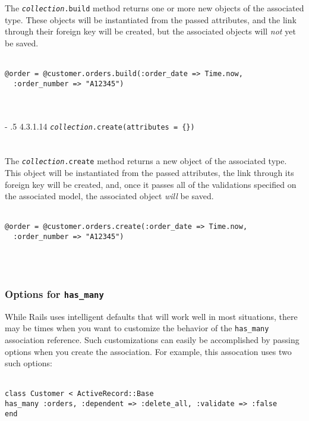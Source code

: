 \documentclass[10pt]{book}
\makeatletter
\renewcommand\paragraph{%
   \@startsection{paragraph}{4}{0mm}%
      {-\baselineskip}%
      {.5\baselineskip}%
      {\normalfont\scriptsize\bfseries}}
\makeatother
\begin{document}
The \texttt{\emph{collection}.build} method returns one or more new  objects of the associated type. These objects will be instantiated from  the passed attributes, and the link through their foreign key will be  created, but the associated objects will \emph{not} yet be saved.
\\ \\
\begin{minipage}{\textwidth}{\scriptsize
\begin{verbatim}
@order = @customer.orders.build(:order_date => Time.now,
  :order_number => "A12345")
\end{verbatim}}
\end{minipage}
\\ \\

\paragraph{4.3.1.14 \texttt{\emph{collection}.create(attributes = \{\})}}\\ \\\\

The \texttt{\emph{collection}.create} method returns a new object  of the associated type. This object will be instantiated from the passed  attributes, the link through its foreign key will be created, and, once  it passes all of the validations specified on the associated model, the  associated object \emph{will} be saved.
\\ \\
\begin{minipage}{\textwidth}{\scriptsize
\begin{verbatim}
@order = @customer.orders.create(:order_date => Time.now,
  :order_number => "A12345")
\end{verbatim}}
\end{minipage}
\\ \\

\subsubsection{ Options for \texttt{has\_many}}

While Rails uses intelligent defaults that will work well in most  situations, there may be times when you want to customize the behavior  of the \texttt{has\_many} association reference. Such customizations can  easily be accomplished by passing options when you create the  association. For example, this assocation uses two such options:
\\ \\
\begin{minipage}{\textwidth}{\scriptsize
\begin{verbatim}
class Customer < ActiveRecord::Base
has_many :orders, :dependent => :delete_all, :validate => :false
end
\end{verbatim}}
\end{minipage}
\\ \\
\end{document}
